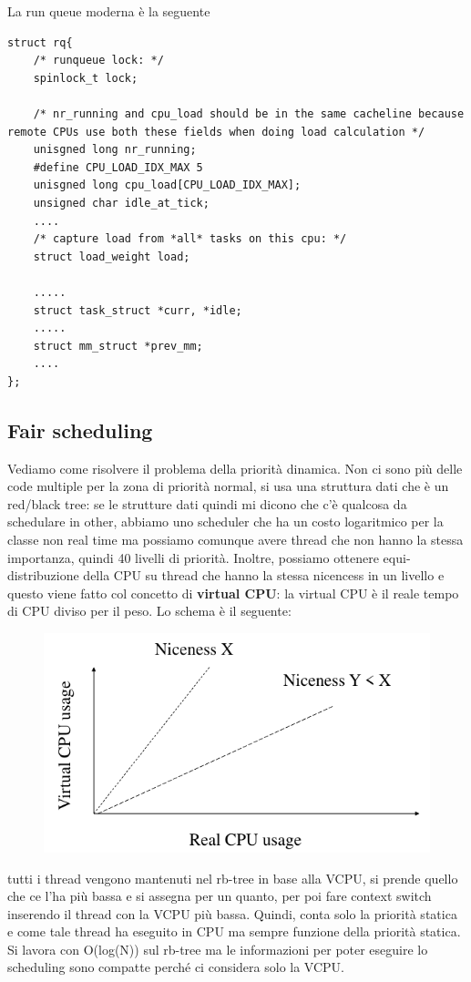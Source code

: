 \documentclass[12pt, oneside]{extbook}
\begin{document}
La run queue moderna è la seguente
\begin{lstlisting}
struct rq{
	/* runqueue lock: */
	spinlock_t lock;
	
	/* nr_running and cpu_load should be in the same cacheline because remote CPUs use both these fields when doing load calculation */
	unisgned long nr_running;
	#define CPU_LOAD_IDX_MAX 5
	unisgned long cpu_load[CPU_LOAD_IDX_MAX];
	unsigned char idle_at_tick;
	....
	/* capture load from *all* tasks on this cpu: */
	struct load_weight load;
	
	.....
	struct task_struct *curr, *idle;
	.....
	struct mm_struct *prev_mm;
	....
};
\end{lstlisting}
\subsection{Fair scheduling}
Vediamo come risolvere il problema della priorità dinamica. Non ci sono più delle code multiple per la zona di priorità normal, si usa una struttura dati che è un red/black tree: se le strutture dati quindi mi dicono che c'è qualcosa da schedulare in other, abbiamo uno scheduler che ha un costo logaritmico per la classe non real time ma possiamo comunque avere thread che non hanno la stessa importanza, quindi 40 livelli di priorità. Inoltre, possiamo ottenere equi-distribuzione della CPU su thread che hanno la stessa nicencess in un livello e questo viene fatto col concetto di \textbf{virtual CPU}: la virtual CPU è il reale tempo di CPU diviso per il peso. Lo schema è il seguente:
\begin{figure}[!h]
	\includegraphics[scale=0.5]{immagini/vcpu_schema.png}
\end{figure}
tutti i thread vengono mantenuti nel rb-tree in base alla VCPU, si prende quello che ce l'ha più bassa e si assegna per un quanto, per poi fare context switch inserendo il thread con la VCPU più bassa. Quindi, conta solo la priorità statica e come tale thread ha eseguito in CPU ma sempre funzione della priorità statica.\\Si lavora con O(log(N)) sul rb-tree ma le informazioni per poter eseguire lo scheduling sono compatte perché ci considera solo la VCPU.
\end{document}
